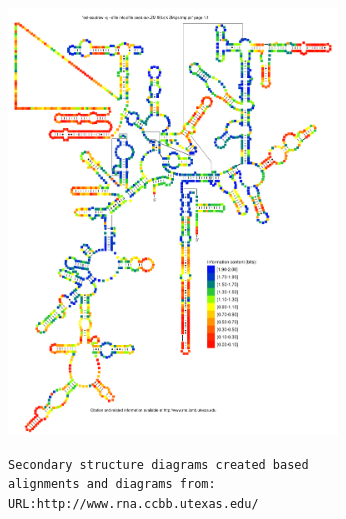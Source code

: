 \documentclass[landscape]{slides}
\begin{document}
\begin{slide}
\begin{center}
\includegraphics[height=4.45in]{figs/euk_info_heat}
\end{center}

\begin{flushright}
\tiny{\texttt{Secondary structure diagrams created based}} \\
\tiny{\texttt{alignments and diagrams from:}} \\
\tiny{\texttt{URL:http://www.rna.ccbb.utexas.edu/}}
\end{flushright}
\vfill
\end{slide}
\end{document}
